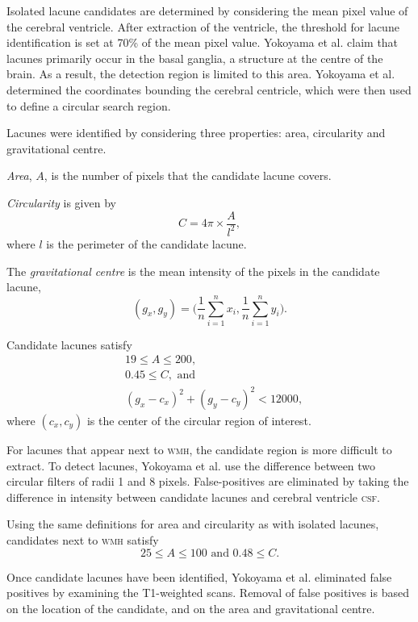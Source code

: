 Isolated lacune candidates are determined by considering the mean pixel value of the cerebral ventricle. After extraction of the ventricle, the threshold for lacune identification is set at 70\% of the mean pixel value. Yokoyama et al. claim that lacunes primarily occur in the basal ganglia, a structure at the centre of the brain. As a result, the detection region is limited to this area. Yokoyama et al. determined the coordinates bounding the cerebral centricle, which were then used to define a circular search region.

Lacunes were identified by considering three properties: area, circularity and gravitational centre.

\textit{Area}, $A$, is the number of pixels that the candidate lacune covers. 

\textit{Circularity} is given by
\[
	C = 4\pi \times \dfrac{A}{l^2},
\]
where $l$ is the perimeter of the candidate lacune.

The \textit{gravitational centre} is the mean intensity of the pixels in the candidate lacune,
\[
	(g_x, g_y) = \bigg(\dfrac{1}{n}\sum_{i=1}^nx_i, \dfrac{1}{n}\sum_{i=1}^ny_i\bigg).
\]


Candidate lacunes satisfy
\begin{align*}
	& 19 \le A \le 200, \\
	& 0.45 \le C,\text{ and } \\
	& (g_x - c_x)^2 + (g_y - c_y)^2 < 12000,
\end{align*}
where $(c_x, c_y)$ is the center of the circular region of interest.

For lacunes that appear next to \textsc{wmh}, the candidate region is more difficult to extract. To detect lacunes, Yokoyama et al. use the difference between two circular filters of radii 1 and 8 pixels. False-positives are eliminated by taking the difference in intensity between candidate lacunes and cerebral ventricle \textsc{csf}.

Using the same definitions for area and circularity as with isolated lacunes, candidates next to \textsc{wmh} satisfy
\[
	25 \le A \le 100\text{ and } 0.48 \le C.
\]

Once candidate lacunes have been identified, Yokoyama et al. eliminated false positives by examining the T1-weighted scans. Removal of false positives is based on the location of the candidate, and on the area and gravitational centre.

